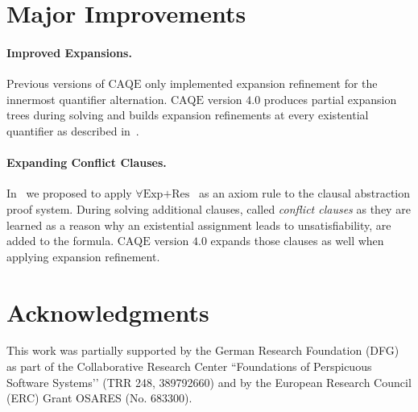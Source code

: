 \documentclass[11pt,twocolumn]{article}
\newcommand{\caqe}{\text{CAQE}}
\begin{document}
\section{Major Improvements}

\paragraph{Improved Expansions.}

Previous versions of $\caqe$ only implemented expansion refinement for the innermost quantifier alternation.
$\caqe$ version $4.0$ produces partial expansion trees during solving and builds expansion refinements at every existential quantifier as described in~\cite{conf/cav/Tentrup17}.

\paragraph{Expanding Conflict Clauses.}

In~\cite{conf/cav/Tentrup17} we proposed to apply $\forall\text{Exp+Res}$~\cite{journals/tcs/JanotaM15} as an axiom rule to the clausal abstraction proof system.
During solving additional clauses, called \emph{conflict clauses} as they are learned as a reason why an existential assignment leads to unsatisfiability, are added to the formula.
$\caqe$ version $4.0$ expands those clauses as well when applying expansion refinement.


\section{Acknowledgments}

This work was partially supported by the German Research Foundation (DFG) as part of the Collaborative Research Center ``Foundations of Perspicuous Software Systems’' (TRR 248, 389792660) and by the European Research Council (ERC) Grant OSARES (No. 683300).




\end{document}
